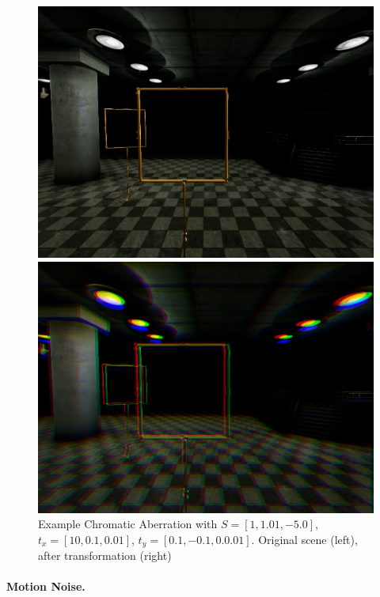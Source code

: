 \begin{figure}[htbp]
	\centering
	\begin{minipage}{0.49\textwidth}
		\includegraphics[width=\textwidth]{fig/gate_example}
	\end{minipage}
	\begin{minipage}{0.49\textwidth}
		\includegraphics[width=\textwidth]{fig/gate_example_chromatic}
	\end{minipage}
	\caption{Example Chromatic Aberration with $S=[1, 1.01, -5.0]$, $t_x=[10,0.1,0.01]$, $t_y=[0.1,-0.1,0.0.01]$. Original scene (left), after transformation (right)}
	\label{fig:chromatic}
\end{figure}


\paragraph{Motion Noise.}

